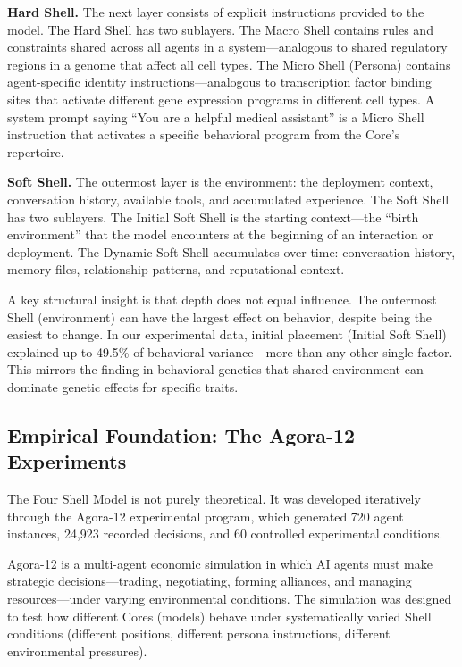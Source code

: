 \documentclass[11pt]{article}
\begin{document}
\textbf{Hard Shell.} The next layer consists of explicit instructions provided to the model. The Hard Shell has two sublayers. The Macro Shell contains rules and constraints shared across all agents in a system---analogous to shared regulatory regions in a genome that affect all cell types. The Micro Shell (Persona) contains agent-specific identity instructions---analogous to transcription factor binding sites that activate different gene expression programs in different cell types. A system prompt saying ``You are a helpful medical assistant'' is a Micro Shell instruction that activates a specific behavioral program from the Core's repertoire.

\textbf{Soft Shell.} The outermost layer is the environment: the deployment context, conversation history, available tools, and accumulated experience. The Soft Shell has two sublayers. The Initial Soft Shell is the starting context---the ``birth environment'' that the model encounters at the beginning of an interaction or deployment. The Dynamic Soft Shell accumulates over time: conversation history, memory files, relationship patterns, and reputational context.

A key structural insight is that depth does not equal influence. The outermost Shell (environment) can have the largest effect on behavior, despite being the easiest to change. In our experimental data, initial placement (Initial Soft Shell) explained up to 49.5\% of behavioral variance---more than any other single factor. This mirrors the finding in behavioral genetics that shared environment can dominate genetic effects for specific traits.

\subsection{Empirical Foundation: The Agora-12 Experiments}

The Four Shell Model is not purely theoretical. It was developed iteratively through the Agora-12 experimental program, which generated 720 agent instances, 24,923 recorded decisions, and 60 controlled experimental conditions.

Agora-12 is a multi-agent economic simulation in which AI agents must make strategic decisions---trading, negotiating, forming alliances, and managing resources---under varying environmental conditions. The simulation was designed to test how different Cores (models) behave under systematically varied Shell conditions (different positions, different persona instructions, different environmental pressures).
\end{document}
